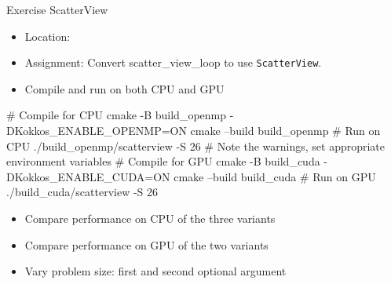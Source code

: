 \begin{frame}[fragile]{Exercise ScatterView}

  \begin{small}
  \begin{itemize}
  \item Location: 
  \item Assignment: Convert scatter\_view\_loop to use \texttt{ScatterView}.
  \item Compile and run on both CPU and GPU
  \end{itemize}
  \end{small}

\begin{code}
  # Compile for CPU
  cmake -B build_openmp -DKokkos_ENABLE_OPENMP=ON
  cmake --build build_openmp
  # Run on CPU
  ./build_openmp/scatterview -S 26
  # Note the warnings, set appropriate environment variables
  # Compile for GPU
  cmake -B build_cuda -DKokkos_ENABLE_CUDA=ON
  cmake --build build_cuda
  # Run on GPU
  ./build_cuda/scatterview -S 26
\end{code}

  \begin{scriptsize}
  \begin{itemize}
  \item Compare performance on CPU of the three variants
  \item Compare performance on GPU of the two variants
  \item Vary problem size: first and second optional argument
  \end{itemize}
  \end{scriptsize}

\end{frame}

